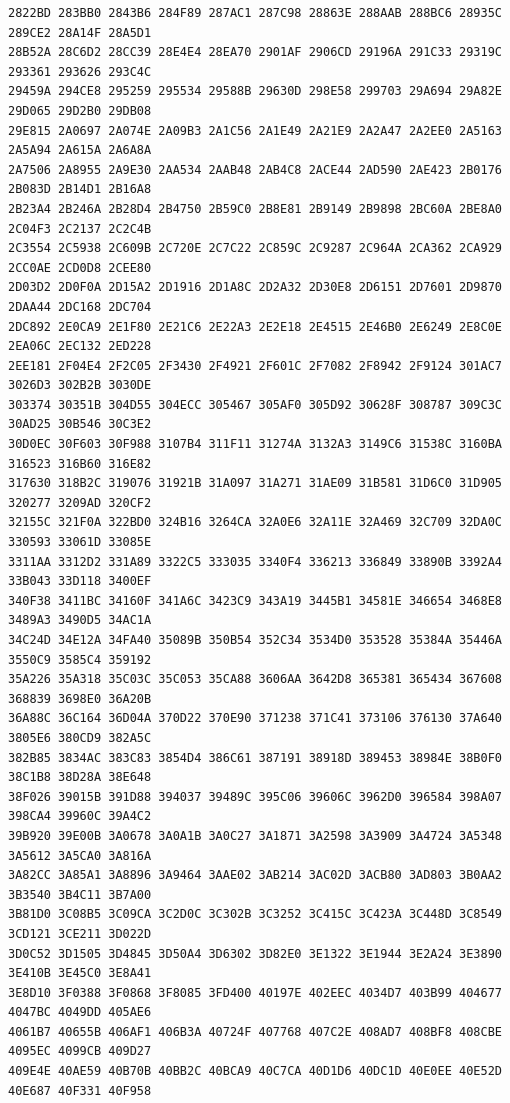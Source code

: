 \documentclass[11pt]{amsart}
\theoremstyle{remark}
\begin{document}
{\tiny
\begin{verbatim}
2822BD 283BB0 2843B6 284F89 287AC1 287C98 28863E 288AAB 288BC6 28935C 289CE2 28A14F 28A5D1
28B52A 28C6D2 28CC39 28E4E4 28EA70 2901AF 2906CD 29196A 291C33 29319C 293361 293626 293C4C
29459A 294CE8 295259 295534 29588B 29630D 298E58 299703 29A694 29A82E 29D065 29D2B0 29DB08
29E815 2A0697 2A074E 2A09B3 2A1C56 2A1E49 2A21E9 2A2A47 2A2EE0 2A5163 2A5A94 2A615A 2A6A8A
2A7506 2A8955 2A9E30 2AA534 2AAB48 2AB4C8 2ACE44 2AD590 2AE423 2B0176 2B083D 2B14D1 2B16A8
2B23A4 2B246A 2B28D4 2B4750 2B59C0 2B8E81 2B9149 2B9898 2BC60A 2BE8A0 2C04F3 2C2137 2C2C4B
2C3554 2C5938 2C609B 2C720E 2C7C22 2C859C 2C9287 2C964A 2CA362 2CA929 2CC0AE 2CD0D8 2CEE80
2D03D2 2D0F0A 2D15A2 2D1916 2D1A8C 2D2A32 2D30E8 2D6151 2D7601 2D9870 2DAA44 2DC168 2DC704
2DC892 2E0CA9 2E1F80 2E21C6 2E22A3 2E2E18 2E4515 2E46B0 2E6249 2E8C0E 2EA06C 2EC132 2ED228
2EE181 2F04E4 2F2C05 2F3430 2F4921 2F601C 2F7082 2F8942 2F9124 301AC7 3026D3 302B2B 3030DE
303374 30351B 304D55 304ECC 305467 305AF0 305D92 30628F 308787 309C3C 30AD25 30B546 30C3E2
30D0EC 30F603 30F988 3107B4 311F11 31274A 3132A3 3149C6 31538C 3160BA 316523 316B60 316E82
317630 318B2C 319076 31921B 31A097 31A271 31AE09 31B581 31D6C0 31D905 320277 3209AD 320CF2
32155C 321F0A 322BD0 324B16 3264CA 32A0E6 32A11E 32A469 32C709 32DA0C 330593 33061D 33085E
3311AA 3312D2 331A89 3322C5 333035 3340F4 336213 336849 33890B 3392A4 33B043 33D118 3400EF
340F38 3411BC 34160F 341A6C 3423C9 343A19 3445B1 34581E 346654 3468E8 3489A3 3490D5 34AC1A
34C24D 34E12A 34FA40 35089B 350B54 352C34 3534D0 353528 35384A 35446A 3550C9 3585C4 359192
35A226 35A318 35C03C 35C053 35CA88 3606AA 3642D8 365381 365434 367608 368839 3698E0 36A20B
36A88C 36C164 36D04A 370D22 370E90 371238 371C41 373106 376130 37A640 3805E6 380CD9 382A5C
382B85 3834AC 383C83 3854D4 386C61 387191 38918D 389453 38984E 38B0F0 38C1B8 38D28A 38E648
38F026 39015B 391D88 394037 39489C 395C06 39606C 3962D0 396584 398A07 398CA4 39960C 39A4C2
39B920 39E00B 3A0678 3A0A1B 3A0C27 3A1871 3A2598 3A3909 3A4724 3A5348 3A5612 3A5CA0 3A816A
3A82CC 3A85A1 3A8896 3A9464 3AAE02 3AB214 3AC02D 3ACB80 3AD803 3B0AA2 3B3540 3B4C11 3B7A00
3B81D0 3C08B5 3C09CA 3C2D0C 3C302B 3C3252 3C415C 3C423A 3C448D 3C8549 3CD121 3CE211 3D022D
3D0C52 3D1505 3D4845 3D50A4 3D6302 3D82E0 3E1322 3E1944 3E2A24 3E3890 3E410B 3E45C0 3E8A41
3E8D10 3F0388 3F0868 3F8085 3FD400 40197E 402EEC 4034D7 403B99 404677 4047BC 4049DD 405AE6
4061B7 40655B 406AF1 406B3A 40724F 407768 407C2E 408AD7 408BF8 408CBE 4095EC 4099CB 409D27
409E4E 40AE59 40B70B 40BB2C 40BCA9 40C7CA 40D1D6 40DC1D 40E0EE 40E52D 40E687 40F331 40F958

\end{verbatim}}
\end{document}
